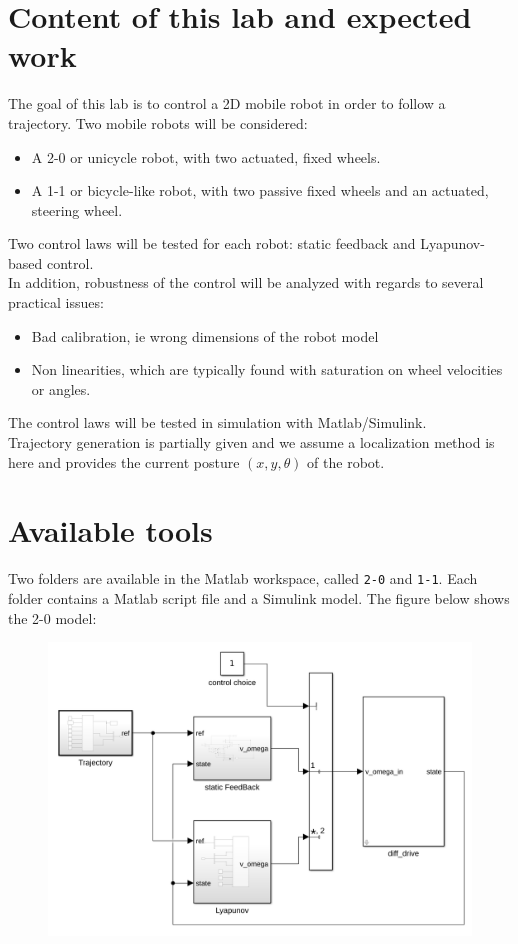 \documentclass{ecnreport}
\begin{document}



\section{Content of this lab and expected work}

The goal of this lab is to control a 2D mobile robot in order to follow a trajectory. Two mobile robots will be considered:
\begin{itemize}
 \item A 2-0 or unicycle robot, with two actuated, fixed wheels.
 \item A 1-1 or bicycle-like robot, with two passive fixed wheels and an actuated, steering wheel.
\end{itemize}

Two control laws will be tested for each robot: static feedback and Lyapunov-based control.\\

In addition, robustness of the control will be analyzed with regards to several practical issues:
\begin{itemize}
 \item Bad calibration, ie wrong dimensions of the robot model 
 \item Non linearities, which are typically found with saturation on wheel velocities or angles.
\end{itemize}

The control laws will be tested in simulation with Matlab/Simulink.\\
Trajectory generation is partially given and we assume a localization method is here and provides the current posture $(x,y,\theta)$  of the robot. 

\section{Available tools}

Two folders are available in the Matlab workspace, called \texttt{2-0} and \texttt{1-1}.
Each folder contains a Matlab script file and a Simulink model. The figure below shows the 2-0 model:
\begin{figure}[h]\centering
 \includegraphics[width=.64\linewidth]{simulink}
\end{figure}
\end{document}
